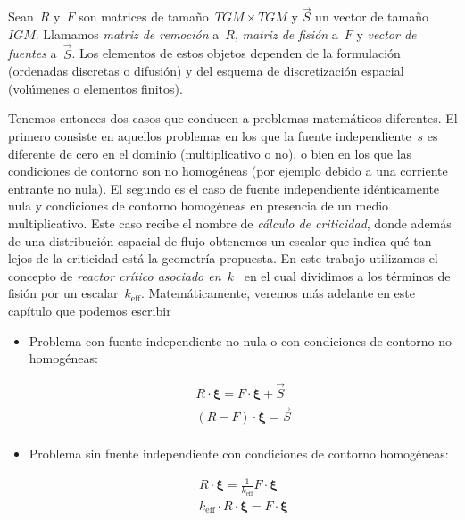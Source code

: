 \begin{definicion}
Sean~$R$ y~$F$ son matrices de tamaño~$TGM \times TGM$ y $\vec{S}$ un vector de tamaño~$IGM$. Llamamos \emph{matriz de remoción} a~$R$, \emph{matriz de fisión} a~$F$ y \emph{vector de fuentes} a~$\vec{S}$. Los elementos de estos objetos dependen de la formulación (ordenadas discretas o difusión) y del esquema de discretización espacial (volúmenes o elementos finitos). 
\end{definicion}

Tenemos entonces dos casos que conducen a problemas matemáticos diferentes. El primero consiste en aquellos problemas en los que la fuente independiente~$s$ es diferente de cero en el dominio (multiplicativo o no), o bien en los que las condiciones de contorno son no homogéneas (por ejemplo debido a una corriente entrante no nula). El segundo es el caso de fuente independiente idénticamente nula y condiciones de contorno homogéneas en presencia de un medio multiplicativo. Este caso recibe el nombre de \emph{cálculo de criticidad}, donde además de una distribución espacial de flujo obtenemos un escalar que indica qué tan lejos de la criticidad está la geometría propuesta. En este trabajo utilizamos el concepto de \emph{reactor crítico asociado en~$k$}~\cite{duderstadt,henry} en el cual dividimos a los términos de fisión por un escalar~$k_\text{eff}$. Matemáticamente, veremos más adelante en este capítulo que podemos escribir  

\begin{itemize}
 \item Problema con fuente independiente no nula o con condiciones de contorno no homogéneas:
 
\begin{align*}
 R \cdot \boldsymbol{\xi} = F \cdot \boldsymbol{\xi} + \vec{S} \\
 (R-F) \cdot \boldsymbol{\xi} = \vec{S} \\
\end{align*}
 
 \item Problema sin fuente independiente con condiciones de contorno homogéneas:
 
\begin{align*}
 R \cdot \boldsymbol{\xi} = \frac{1}{k_\text{eff}} F \cdot \boldsymbol{\xi} \\
 k_\text{eff} \cdot R \cdot \boldsymbol{\xi} = F \cdot \boldsymbol{\xi} \\
\end{align*}
\end{itemize}



